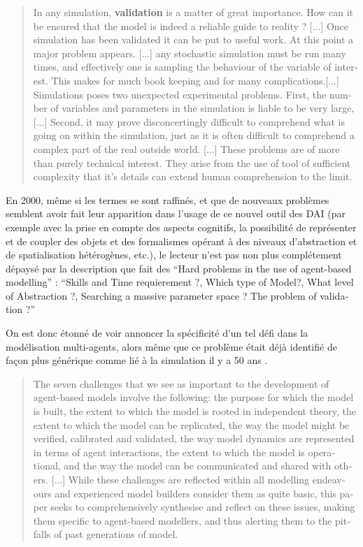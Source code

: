 \foreignblockquote{english}[{\cite[301]{Doran1975}}]{In any simulation, \textbf{validation} is a matter of great importance. How can it be ensured that the model is indeed a reliable guide to reality ? [...] Once simulation has been validated it can be put to useful work. At this point a major problem appears. [...] any stochastic simulation must be run many times, and effectively one is sampling the behaviour of the variable of interest. This makes for much book keeping and for many complications.[...] Simulations poses two unexpected experimental problems. First, the number of variables and parameters in the simulation is liable to be very large, [...] Second, it may prove disconcertingly difficult to comprehend what is going on within the simulation, just as it is often difficult to comprehend a complex part of the real outside world. [...] These problems are of more than purely technical interest. They arise from the use of tool of sufficient complexity that it's details can extend human comprehension to the limit.}

En 2000, même si les termes se sont raffinés, et que de nouveaux problèmes semblent avoir fait leur apparition dans l'usage de ce nouvel outil des DAI (par exemple avec la prise en compte des aspects cognitifs, la possibilité de représenter et de coupler des objets et des formalismes opérant à des niveaux d'abstraction et de spatialisation hétérogènes, etc.), le lecteur n'est pas non plus complétement dépaysé par la description que fait \textcite{Doran2000} des \foreignquote{english}{Hard problems in the use of agent-based modelling} : \foreignquote{english}{Skills and Time requierement ?, Which type of Model?, What level of Abstraction ?, Searching a massive parameter space ? The problem of validation ?}

On est donc étonné de voir \textcites[93-94]{Crooks2012}{Crooks2008} annoncer la spécificité d'un tel défi dans la modélisation multi-agents, alors même que ce problème était déjà identifié de façon plus générique comme lié à la simulation il y a 50 ans \autocites{Naylor1967, Hermann1967}. 

\foreignblockquote{english}[{\cite[93-94]{Crooks2012}}]{The seven challenges that we see as important to the development of agent-based models involve the following: the purpose for which the model is built, the extent to which the model is rooted in independent theory, the extent to which the model can be replicated, the way the model might be verified, calibrated and validated, the way model dynamics are represented in terms of agent interactions, the extent to which the model is operational, and the way the model can be communicated and shared with others. [...] While these challenges are reflected within all modelling endeavours and experienced model builders consider them as quite basic, this paper seeks to comprehensively synthesise and reflect on these issues, making them specific to agent-based modellers, and thus alerting them to the pitfalls of past generations of model.}

